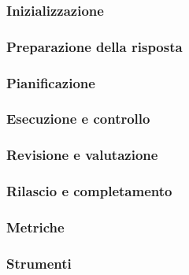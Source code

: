 \subsubsection{Inizializzazione}


\subsubsection{Preparazione della risposta}


\subsubsection{Pianificazione}\label{sec:Pianificazione}


\subsubsection{Esecuzione e controllo}


\subsubsection{Revisione e valutazione}


\subsubsection{Rilascio e completamento}


\subsubsection{Metriche}


\subsubsection{Strumenti}

